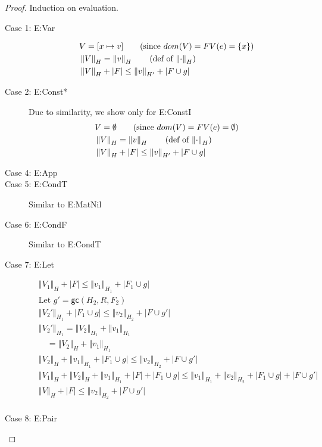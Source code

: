 \documentclass[11pt]{article}
\newcommand{\ssize}[2]{\left\Vert #2 \right\Vert_{#1}}
\newcommand{\gc}[3]{\mathsf{gc}(#1,#2,#3)}
\theoremstyle{definition}
\begin{document}
\begin{proof}
Induction on evaluation.\\
\begin{description}
  \item[Case 1: E:Var]
  \begin{align*}
  &V = [x \mapsto v] \tag{since $dom(V) = FV(e) = \{x\}$}\\
  &\ssize{H}{V} = \ssize{H}{v} \tag{def of $\ssize{H}{\cdot}$}\\
  &\ssize{H}{V} + |F| \le \ssize{H'}{v} + |F \cup g|\\
  \end{align*}
  \item[Case 2: E:Const*]
  Due to similarity, we show only for E:ConstI
  \begin{align*}
  &V = \emptyset \tag{since $dom(V) = FV(e) = \emptyset$}\\
  &\ssize{H}{V} = \ssize{H}{v} \tag{def of $\ssize{H}{\cdot}$}\\
  &\ssize{H}{V} + |F| \le \ssize{H'}{v} + |F \cup g|\\
  \end{align*}
  \item[Case 4: E:App]
  \item[Case 5: E:CondT] Similar to E:MatNil
  \item[Case 6: E:CondF] Similar to E:CondT
  \item [Case 7: E:Let]
  \begin{align*}
  &\ssize{H}{V_1} + |F| \le \ssize{H_1}{v_1} + |F_1 \cup g| \tag{IH on first premise}\\ 
  &\text{Let } g' = \gc{H_2}{R}{F_2}\\
  &\ssize{H_1}{V_2'} + |F_1 \cup g| \le \ssize{H_2}{v_2} + |F \cup g'| \tag{IH on second premise}\\
  &\ssize{H_1}{V_2'} = \ssize{H_1}{V_2} + \ssize{H_1}{v_1} \tag{definition of semantic size}\\
  &\quad = \ssize{H}{V_2} + \ssize{H_1}{v_1} \tag{main lemma}\\
  &\ssize{H}{V_2} + \ssize{H_1}{v_1} + |F_1 \cup g| \le \ssize{H_2}{v_2} + |F \cup g'|\\
  &\ssize{H}{V_1} + \ssize{H}{V_2} + \ssize{H_1}{v_1} + |F| + |F_1 \cup g| \le \ssize{H_1}{v_1} + \ssize{H_2}{v_2} +
  |F_1 \cup g| + |F \cup g'|\\
  &\ssize{H}{V} + |F| \le \ssize{H_2}{v_2} + |F \cup g'|\\
  \end{align*}
  \item[Case 8: E:Pair]

\end{description}
\end{proof}
\end{document}
